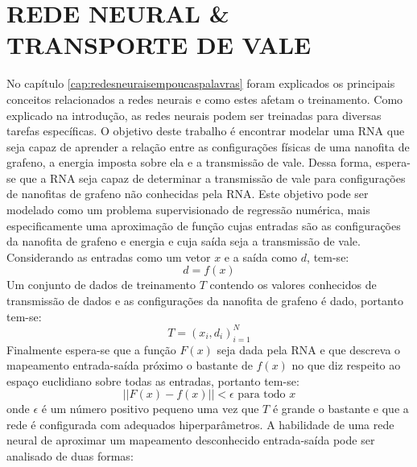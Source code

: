 \chapter{REDE NEURAL \& TRANSPORTE DE VALE}
No capítulo \ref{cap:redesneuraisempoucaspalavras} foram explicados os principais conceitos relacionados a redes neurais e como estes afetam o treinamento. Como explicado na introdução, as redes neurais podem ser treinadas para diversas tarefas específicas. O objetivo deste trabalho é encontrar modelar uma RNA que seja capaz de aprender a relação entre as configurações físicas de uma nanofita de grafeno, a energia imposta sobre ela e a transmissão de vale. Dessa forma, espera-se que a RNA seja capaz de determinar a transmissão de vale para configurações de nanofitas de grafeno não conhecidas pela RNA. 
Este objetivo pode ser modelado como um problema supervisionado de regressão numérica, mais especificamente uma aproximação de função \cite{cybenko1989approximation, hornik1989multilayer} cujas entradas são as configurações da nanofita de grafeno e energia e cuja saída seja a transmissão de vale. Considerando as entradas como um vetor \textbf{$x$} e a saída como \textbf{$d$}, tem-se:
\begin{equation*}
    d=f(x)
\end{equation*}
Um conjunto de dados de treinamento $T$ contendo os valores conhecidos de transmissão de dados e as configurações da nanofita de grafeno é dado, portanto tem-se:
\begin{equation}
\label{eqn:conjuntoTreinamento}
    T = {(x_i,d_i)}^N_{i=1} 
\end{equation}
Finalmente espera-se que a função $F(x)$ seja dada pela RNA e que descreva o mapeamento entrada-saída próximo o bastante de $f(x)$ no que diz respeito ao espaço euclidiano sobre todas as entradas, portanto tem-se:
\begin{equation*}
    ||F(x) - f(x)|| < \epsilon \text{ para todo } x
\end{equation*}
onde $\epsilon$ é um número positivo pequeno uma vez que $T$ é grande o bastante e que a rede é configurada com adequados hiperparâmetros.
A habilidade de uma rede neural de aproximar um mapeamento desconhecido entrada-saída pode ser analisado de duas formas:

